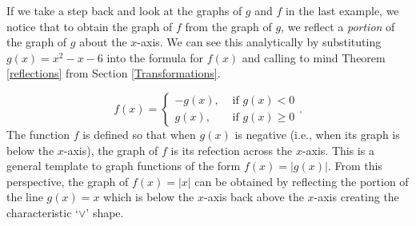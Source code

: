 If we take a step back and look at the graphs of $g$ and $f$ in the last example,  we notice that to obtain the graph of $f$ from the graph of  $g$, we reflect a \textit{portion} of the graph of $g$ about the $x$-axis.  We can see this analytically by substituting $g(x) = x^2-x-6$ into the formula for $f(x)$ and calling to mind Theorem \ref{reflections} from Section \ref{Transformations}.

\[
 f(x) = \begin{cases}
 		 -g(x), & \mbox{ if }  g(x) < 0  \\
 		  g(x), & \mbox{ if }  g(x) \geq 0
 		\end{cases}.
\]
The function $f$ is defined so that when $g(x)$ is negative (i.e., when its graph is below the $x$-axis), the graph of $f$ is its refection across the $x$-axis.   This is a general template to graph functions of the form $f(x) = |g(x)|$.  From this perspective, the graph of $f(x) = |x|$ can be obtained by reflecting the portion of the line $g(x) =x$ which is below the $x$-axis back above the $x$-axis creating the characteristic `$\vee$' shape.  

